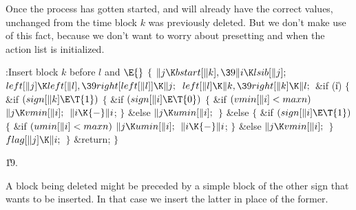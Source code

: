 Once the process has gotten started, 
and  will
already have the correct values, unchanged from the time block $k$ was
previously deleted. But we don't make use of this fact, because we don't
want to worry about presetting  and  when
the
action list is initialized.

\Y\B\4:Insert block $k$ before $l$ and \X${}\E{}$\6
${}\{{}$\1\6
${}\|j\K\\{bstart}[\|k],\39\|i\K\\{lsib}[\|j];{}$\6
${}\\{left}[\|j]\K\\{left}[\|l],\39\\{right}[\\{left}[\|l]]\K\|j;{}$\6
${}\\{left}[\|l]\K\|k,\39\\{right}[\|k]\K\|l;{}$\6
\&{if} (\|i)\5
${}\{{}$\1\6
\&{if} ${}(\\{sign}[\|k]\E\T{1}){}$\5
${}\{{}$\1\6
\&{if} ${}(\\{sign}[\|i]\E\T{0}){}$\5
${}\{{}$\1\6
\&{if} ${}(\\{vmin}[\|i]<\\{maxn}){}$\1\5
${}\|j\K\\{vmin}[\|i];{}$\2\6
${}\|i\K{-}\|i{}$;\6
\4${}\}{}$\5
\2\&{else}\1\5
${}\|j\K\\{umin}[\|i];{}$\2\6
\4${}\}{}$\5
\2\&{else}\5
${}\{{}$\1\6
\&{if} ${}(\\{sign}[\|i]\E\T{1}){}$\5
${}\{{}$\1\6
\&{if} ${}(\\{umin}[\|i]<\\{maxn}){}$\1\5
${}\|j\K\\{umin}[\|i];{}$\2\6
${}\|i\K{-}\|i{}$;\6
\4${}\}{}$\5
\2\&{else}\1\5
${}\|j\K\\{vmin}[\|i];{}$\2\6
\4${}\}{}$\2\6
${}\\{flag}[\|j]\K\|i;{}$\6
\4${}\}{}$\2\6
\&{return};\6
\4${}\}{}$\2\par
\U19.\fi

A block being deleted might be preceded by a simple block
of the
other sign that wants to be inserted. In that case we insert the latter
in place of the former.

